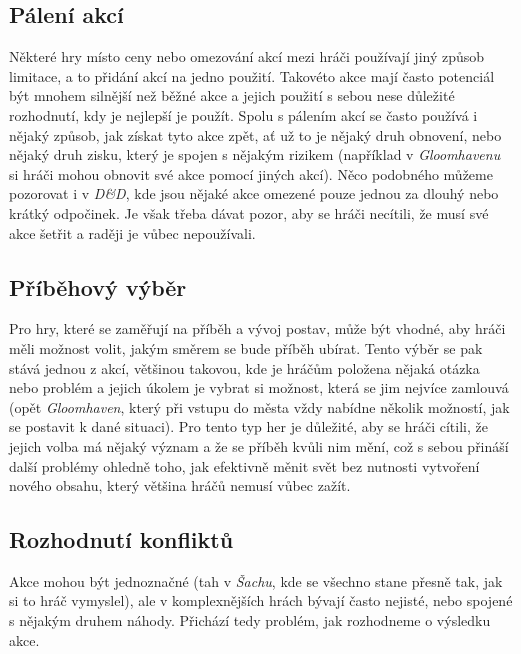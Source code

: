 \subsection{Pálení akcí}
\label{subsec:burning_actions}

Některé hry místo ceny nebo omezování akcí mezi hráči používají jiný způsob limitace, a to přidání akcí na jedno použití. Takovéto akce mají často potenciál být mnohem silnější než běžné akce a jejich použití s sebou nese důležité rozhodnutí, kdy je nejlepší je použít. Spolu s pálením akcí se často používá i nějaký způsob, jak získat tyto akce zpět, ať už to je nějaký druh obnovení, nebo nějaký druh zisku, který je spojen s nějakým rizikem (například v \textit{Gloomhavenu} si hráči mohou obnovit své akce pomocí jiných akcí). Něco podobného můžeme pozorovat i v \textit{D\&D}, kde jsou nějaké akce omezené pouze jednou za dlouhý nebo krátký odpočinek. Je však třeba dávat pozor, aby se hráči necítili, že musí své akce šetřit a raději je vůbec nepoužívali.

\subsection{Příběhový výběr}
\label{subsec:story_choice}

Pro hry, které se zaměřují na příběh a vývoj postav, může být vhodné, aby hráči měli možnost volit, jakým směrem se bude příběh ubírat. Tento výběr se pak stává jednou z akcí, většinou takovou, kde je hráčům položena nějaká otázka nebo problém a jejich úkolem je vybrat si možnost, která se jim nejvíce zamlouvá (opět \textit{Gloomhaven}, který při vstupu do města vždy nabídne několik možností, jak se postavit k dané situaci). Pro tento typ her je důležité, aby se hráči cítili, že jejich volba má nějaký význam a že se příběh kvůli nim mění, což s sebou přináší další problémy ohledně toho, jak efektivně měnit svět bez nutnosti vytvoření nového obsahu, který většina hráčů nemusí vůbec zažít.

\subsection{Rozhodnutí konfliktů}
\label{subsec:action_resolution}

Akce mohou být jednoznačné (tah v \textit{Šachu}, kde se všechno stane přesně tak, jak si to hráč vymyslel), ale v komplexnějších hrách bývají často nejisté, nebo spojené s nějakým druhem náhody. Přichází tedy problém, jak rozhodneme o výsledku akce.

